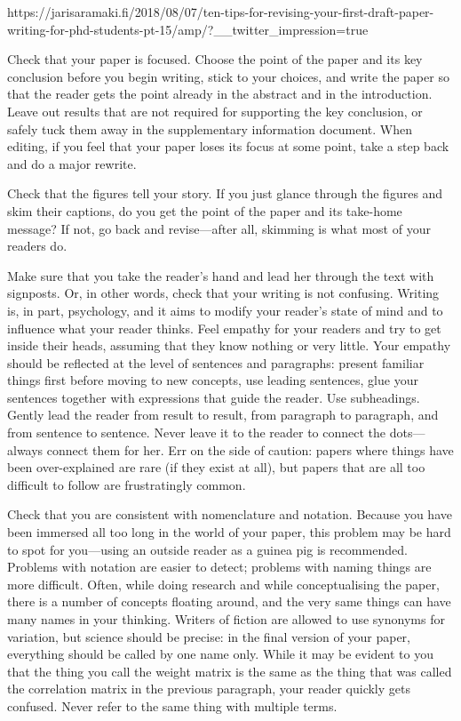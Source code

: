 
https://jarisaramaki.fi/2018/08/07/ten-tips-for-revising-your-first-draft-paper-writing-for-phd-students-pt-15/amp/?\_\_twitter\_impression=true

Check that your paper is focused. Choose the point of the paper and its key conclusion before you begin writing, stick to your choices, and write the paper so that the reader gets the point already in the abstract and in the introduction. Leave out results that are not required for supporting the key conclusion, or safely tuck them away in the supplementary information document. When editing, if you feel that your paper loses its focus at some point, take a step back and do a major rewrite.

Check that the figures tell your story. If you just glance through the figures and skim their captions, do you get the point of the paper and its take-home message? If not, go back and revise—after all, skimming is what most of your readers do.

Make sure that you take the reader’s hand and lead her through the text with signposts. Or, in other words, check that your writing is not confusing. Writing is, in part, psychology, and it aims to modify your reader’s state of mind and to influence what your reader thinks. Feel empathy for your readers and try to get inside their heads, assuming that they know nothing or very little. Your empathy should be reflected at the level of sentences and paragraphs: present familiar things first before moving to new concepts, use leading sentences, glue your sentences together with expressions that guide the reader. Use subheadings. Gently lead the reader from result to result, from paragraph to paragraph, and from sentence to sentence. Never leave it to the reader to connect the dots— always connect them for her. Err on the side of caution: papers where things have been over-explained are rare (if they exist at all), but papers that are all too difficult to follow are frustratingly common.

Check that you are consistent with nomenclature and notation. Because you have been immersed all too long in the world of your paper, this problem may be hard to spot for you—using an outside reader as a guinea pig is recommended. Problems with notation are easier to detect; problems with naming things are more difficult. Often, while doing research and while conceptualising the paper, there is a number of concepts floating around, and the very same things can have many names in your thinking. Writers of fiction are allowed to use synonyms for variation, but science should be precise: in the final version of your paper, everything should be called by one name only. While it may be evident to you that the thing you call the weight matrix is the same as the thing that was called the correlation matrix in the previous paragraph, your reader quickly gets confused. Never refer to the same thing with multiple terms.


